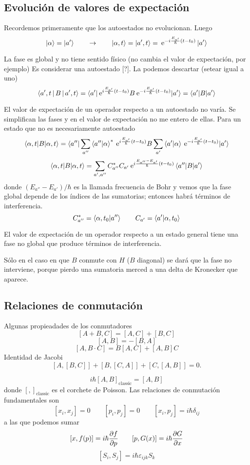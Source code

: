 \documentclass[10pt,oneside]{CBFT_book}
\begin{document}
\subsection{Evolución de valores de expectación}

Recordemos primeramente que los autoestados no evolucionan. Luego 
\[
	\Ket{\alpha} = \Ket{a'} 
	\qquad \to \qquad 
	\Ket{\alpha,t} = \Ket{a',t} =  
	\:\mathrm{e}^{-i\frac{E_{a'}}{\hbar}(t-t_0)} \Ket{a'}
\]

La fase es global y no tiene sentido físico (no cambia el valor de expectación, por ejemplo)
Es considerar una autoestado [?]. La podemos descartar (setear igual a uno)
\[
	\Braket{a',t|B|a',t} = 
	\braket{a'|\:\mathrm{e}^{i\frac{E_{a'}}{\hbar}(t-t_0)}B 
	\:\mathrm{e}^{-i\frac{E_{a'}}{\hbar}(t-t_0)}|a'} = \braket{a'|B|a'}
\]

El valor de expectación de un operador respecto a un autoestado no varía.
Se simplifican las fases y en el valor de expectación no me entero de ellas.
Para un estado que no es necesariamente autoestado
\[
	\braket{\alpha,t|B|\alpha,t} =
	\braket{a''|\sum_{a''} \braket{a''|\alpha}^*\:\mathrm{e}^{i\frac{E_{a'}}{\hbar}(t-t_0)} B 
	\sum_{a'} \braket{a'|\alpha} \:\mathrm{e}^{-i\frac{E_{a'}}{\hbar}(t-t_0)}|a'}
\]
\[
	\braket{\alpha,t|B|\alpha,t} = \sum_{a',a''} C_{a''}^* C_{a'} 
	\:\mathrm{e}^{i\frac{E_{a''}-E_{a'}}{\hbar}(t-t_0)} \braket{a''|  B |a'}
\]
donde $(E_{a''}-E_{a'})/\hbar$ es la llamada frecuencia de Bohr y vemos que la fase
global depende de los índices de las sumatorias; entonces habrá términos de interferencia.
\[
	C_{a''}^* = \braket{\alpha,t_0|a''} \qquad C_{a'} = \braket{a'| \alpha,t_0}  
\]

El valor de expectación de un operador respecto a un estado general tiene una fase no global 
que produce términos de interferencia.

Sólo en el caso en que $B$ conmute con $H$ ($B$ diagonal) se dará que la fase no interviene,
porque pierdo una sumatoria merced a una delta de Kronecker que aparece.

\subsection{Relaciones de conmutación}

Algunas propieadades de los conmutadores
\[
	[ A + B, C] = [A, C] + [B,C] 
\]
\[
	[A, B] = - [B,A]
\]
\[
	[A, B\cdot C] = B[A,C] +  [A,B]C
\]
Identidad de Jacobi
\[
	[ A, [B,C] ] +  [ B, [C,A] ] + [ C, [A,B] ] = 0.
\]

\[
	i\hbar[ A, B]_{\text{classic}} = [A, B]
\]
donde $[ , ]_{\text{classic}}$ es el corchete de Poisson.
Las relaciones de conmutación fundamentales son 
\[
	[x_i, x_j] = 0 \qquad [p_i, p_j]=0 \qquad [x_i,p_j] =i\hbar\delta_{ij}
\]
a las que podemos sumar
\[
	[x,f(p)] = i\hbar\frac{\partial^{\hspace{-0.05em}} {f}}{\partial {p}^{\hspace{-0.05em}}} \qquad [p,G(x)] = i\hbar\frac{\partial^{\hspace{-0.05em}} {G}}{\partial {x}^{\hspace{-0.05em}}} 
\]
\[
	[S_i,S_j] = i\hbar \varepsilon_{ijk}S_k
\]
\end{document}
